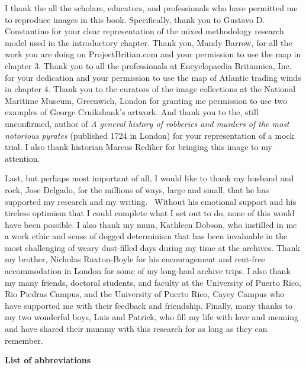 \begin{styleStandard}
I thank the all the scholars, educators, and professionals who have permitted me to reproduce images in this book. Specifically, thank you to Gustavo D. Constantino for your clear representation of the mixed methodology research model used in the introductory chapter. Thank you, Mandy Barrow, for all the work you are doing on ProjectBritian.com and your permission to use the map in chapter 3. Thank you to all the professionals at Encyclopaedia Britannica, Inc. for your dedication and your permission to use the map of Atlantic trading winds in chapter 4. Thank you to the curators of the image collections at the National Maritime Museum, Greenwich, London for granting me permission to use two examples of George Cruikshank’s artwork. And thank you to the, still unconfirmed, author of \textit{A general history of robberies and murders of the most notorious pyrates }(published 1724 in London) for your representation of a mock trial. I also thank historian Marcus Rediker for bringing this image to my attention. 
\end{styleStandard}

\begin{styleStandard}
Last, but perhaps most important of all, I would like to thank my husband and rock, Jose Delgado, for the millions of ways, large and small, that he has supported my research and my writing. \ Without his emotional support and his tireless optimism that I could complete what I set out to do, none of this would have been possible. I also thank my mum, Kathleen Dobson, who instilled in me a work ethic and sense of dogged determinism that has been invaluable in the most challenging of weary dust-filled days during my time at the archives. Thank my brother, Nicholas Ruxton-Boyle for his encouragement and rent-free accommodation in London for some of my long-haul archive trips. I also thank my many friends, doctoral students, and faculty at the University of Puerto Rico, Rio Piedras Campus, and the University of Puerto Rico, Cayey Campus who have supported me with their feedback and friendship. Finally, many thanks to my two wonderful boys, Luis and Patrick, who fill my life with love and meaning and have shared their mummy with this research for as long as they can remember. 
\end{styleStandard}

\clearpage\begin{styleStandard}
\textbf{List of abbreviations}
\end{styleStandard}

